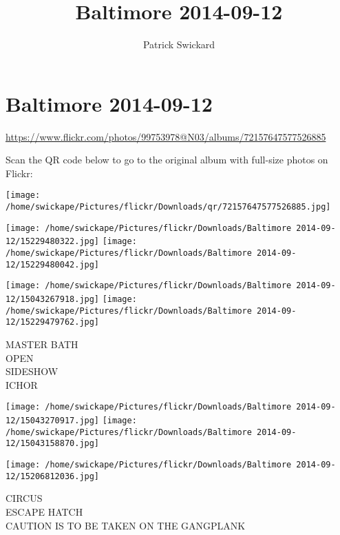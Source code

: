 \documentclass[10pt,letterpaper]{article}
\title{Baltimore 2014-09-12}
\author{Patrick Swickard}
\date{}
\begin{document}
\section*{Baltimore 2014-09-12}

\url{https://www.flickr.com/photos/99753978@N03/albums/72157647577526885}

Scan the QR code below to go to the original album with full-size photos on Flickr:

\texttt{[image: /home/swickape/Pictures/flickr/Downloads/qr/72157647577526885.jpg]}
\pagebreak

\texttt{[image: /home/swickape/Pictures/flickr/Downloads/Baltimore 2014-09-12/15229480322.jpg]}
\texttt{[image: /home/swickape/Pictures/flickr/Downloads/Baltimore 2014-09-12/15229480042.jpg]}

\texttt{[image: /home/swickape/Pictures/flickr/Downloads/Baltimore 2014-09-12/15043267918.jpg]}
\texttt{[image: /home/swickape/Pictures/flickr/Downloads/Baltimore 2014-09-12/15229479762.jpg]}

MASTER BATH\\
OPEN\\
SIDESHOW\\
ICHOR
\pagebreak

\texttt{[image: /home/swickape/Pictures/flickr/Downloads/Baltimore 2014-09-12/15043270917.jpg]}
\texttt{[image: /home/swickape/Pictures/flickr/Downloads/Baltimore 2014-09-12/15043158870.jpg]}

\texttt{[image: /home/swickape/Pictures/flickr/Downloads/Baltimore 2014-09-12/15206812036.jpg]}

CIRCUS\\
ESCAPE HATCH\\
CAUTION IS TO BE TAKEN ON THE GANGPLANK
\pagebreak
\end{document}

